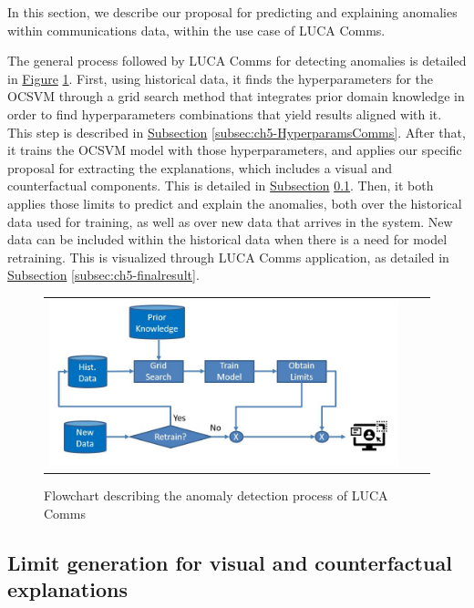 In this section, we describe our proposal for predicting and explaining anomalies within communications data, within the use case of LUCA Comms.

The general process followed by LUCA Comms for detecting anomalies is detailed in \hyperref[fig:ch5-flowchart-comms]{Figure} \ref{fig:ch5-flowchart-comms}. First, using historical data, it finds the hyperparameters for the OCSVM through a grid search method that integrates prior domain knowledge in order to find hyperparameters combinations that yield results aligned with it. This step is described in \hyperref[subsec:ch5-HyperparamsComms]{Subsection} \ref{subsec:ch5-HyperparamsComms}. After that, it trains the OCSVM model with those hyperparameters, and applies our specific proposal for extracting the explanations, which includes a visual and counterfactual components. This is detailed in \hyperref[subsec:ch5-AnomalyLimitsComms]{Subsection} \ref{subsec:ch5-AnomalyLimitsComms}. Then, it both applies those limits to predict and explain the anomalies, both over the historical data used for training, as well as over new data that arrives in the system. New data can be included within the historical data when there is a need for model retraining. This is visualized through LUCA Comms application, as detailed in \hyperref[subsec:ch5-finalresult]{Subsection} \ref{subsec:ch5-finalresult}.

\begin{figure}[h!]
\centering
  \begin{tabular}{c@{\qquad}c@{\qquad}c}
\includegraphics[width=0.80\columnwidth]{figures/chapter5_LucaComms/FlowChartComms.JPG}
  \end{tabular} 
  \caption{Flowchart describing the anomaly detection process of LUCA Comms \parencite{patent2019comms}\label{fig:ch5-flowchart-comms}}
\end{figure}


\subsection{Limit generation for visual and counterfactual explanations}\label{subsec:ch5-AnomalyLimitsComms}

